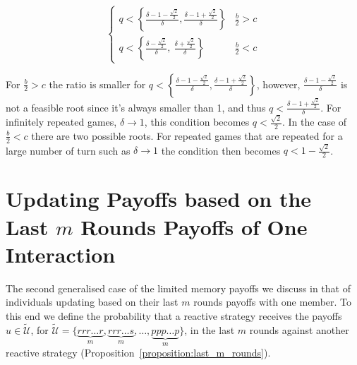 \documentclass[11pt]{article}
\theoremstyle{plainCl1}
\theoremstyle{plainCl2}
\begin{document}
\begin{equation}
\begin{cases}
  q < \left\{\frac{\delta - 1 - \frac{\sqrt{2}}{2}}{\delta}, \frac{\delta - 1 + \frac{\sqrt{2}}{2}}{\delta}\right\}  & \frac{b}{2} > c \\[0.5cm]
  q < \left\{\frac{\delta - \frac{\sqrt{2}}{2}}{\delta}, \  \frac{\delta + \frac{\sqrt{2}}{2}}{\delta}\right\} & \frac{b}{2} < c
\end{cases}
\end{equation}

For \(\frac{b}{2}>c\) the ratio is smaller for \(q < \left\{\frac{\delta - 1 -
\frac{\sqrt{2}}{2}}{\delta}, \frac{\delta - 1 +
\frac{\sqrt{2}}{2}}{\delta}\right\}\), however, \(\frac{\delta - 1 -
\frac{\sqrt{2}}{2}}{\delta}\) is not a feasible root since it's always smaller
than 1, and thus \(q < \frac{\delta - 1 + \frac{\sqrt{2}}{2}}{\delta}\). For
infinitely repeated games, \(\delta \rightarrow 1\), this condition becomes \(q
< \frac{\sqrt{2}}{2}\). In the case of \(\frac{b}{2}<c\) there are two possible
roots. For repeated games that are repeated for a large number of turn such as
\(\delta \rightarrow 1\) the condition then becomes \(q < 1 -
\frac{\sqrt{2}}{2}\).

\section{Updating Payoffs based on the Last $m$ Rounds Payoffs of One Interaction}\label{section:m_two_n_one}

The second generalised case of the limited memory payoffs we discuss in that of
individuals updating based on their last $m$ rounds payoffs with one member. To
this end we define the probability that a reactive strategy receives the payoffs
$u\!\in\! \mathcal{\tilde{U}}$, for \(\mathcal{\tilde{U}}= \{\underbrace{rrr\dots r}_{m},
\underbrace{rrr\dots s}_{m}, \dots, \underbrace{ppp\dots p}_{m}\}\), in the last \(m\) rounds against another
reactive strategy (Proposition~\ref{proposition:last_m_rounds}).
\end{document}
